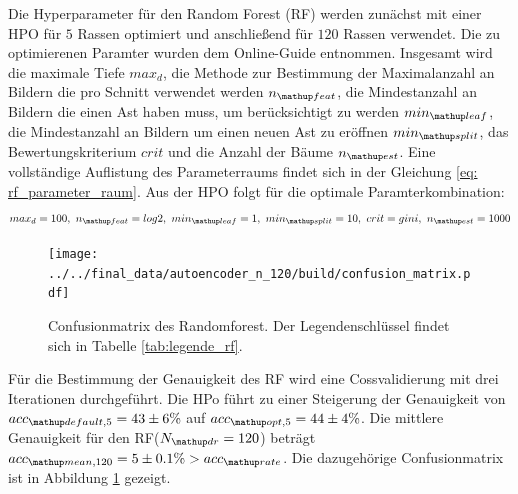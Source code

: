 Die Hyperparameter für den Random Forest (RF) werden zunächst mit
einer HPO für $5$ Rassen optimiert und anschließend für $120$ Rassen verwendet.
Die zu optimierenen Paramter
wurden dem Online-Guide \cite{RF_parameterraum} entnommen. Insgesamt
wird die maximale Tiefe $max_d$, die Methode zur Bestimmung der Maximalanzahl
an Bildern die pro Schnitt verwendet werden
$n\ua{feat}$, die Mindestanzahl an Bildern die einen Ast haben muss,
um berücksichtigt zu werden $min\ua{leaf}$, die Mindestanzahl an Bildern um
einen neuen Ast zu eröffnen $min\ua{split}$, das Bewertungskriterium $crit$ und
die Anzahl der Bäume $n\ua{est}$.
Eine vollständige Auflistung des Parameterraums findet sich in der
Gleichung \eqref{eq: rf_parameter_raum}.
Aus der HPO folgt für die optimale Paramterkombination:
\begin{equation*}
  max_d = 100,\,\, n\ua{feat}= log2, \,\, min\ua{leaf}= 1,\,\, min\ua{split}=10, \,\,   crit= gini, \,\, n\ua{est}=1000
\end{equation*}
\begin{figure}
  \vspace{-25pt}
\begin{center}
\texttt{[image: ../../final\_data/autoencoder\_n\_120/build/confusion\_matrix.pdf]}
\end{center}
\vspace{-20pt}
\caption{Confusionmatrix des Randomforest. Der Legendenschlüssel findet sich in
Tabelle \ref{tab:legende_rf}.}
\label{fig:Confusionmatrix_rf}
\vspace{-100pt}
\end{figure}
Für die Bestimmung der Genauigkeit des RF wird eine Cossvalidierung mit
drei Iterationen durchgeführt. Die HPo führt zu einer Steigerung der Genauigkeit von  $acc\ua{default, 5}=43\pm6\%$ auf $acc\ua{opt, 5}=44\pm4\%$.
Die mittlere Genauigkeit für den RF($N\ua{dr}=120$) beträgt $acc\ua{mean,120}=5\pm0.1\% > acc\ua{rate}$. Die dazugehörige Confusionmatrix ist in Abbildung \ref{fig:Confusionmatrix_rf} gezeigt.
